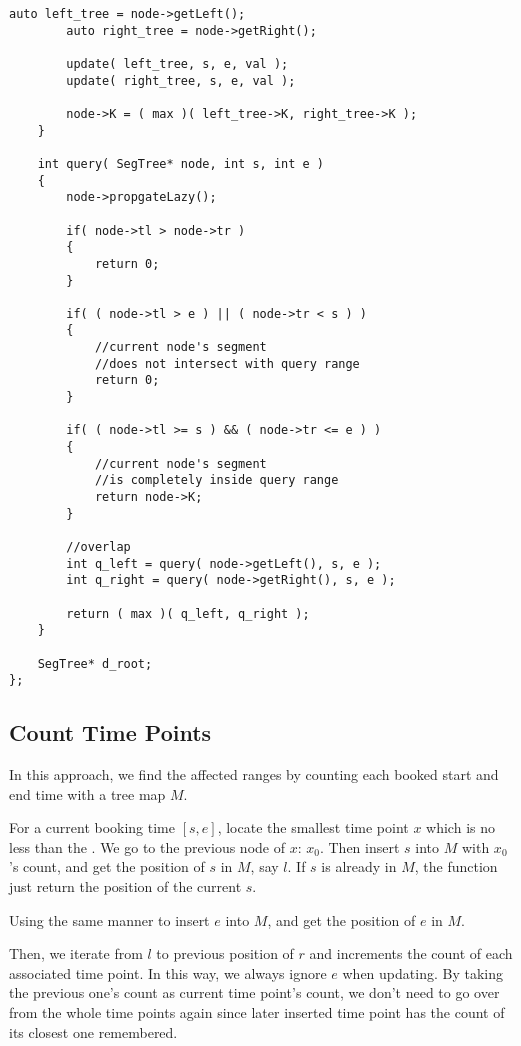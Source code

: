 \begin{lstlisting}[style=customc, caption={Segment Tree}]
        auto left_tree = node->getLeft();
        auto right_tree = node->getRight();

        update( left_tree, s, e, val );
        update( right_tree, s, e, val );

        node->K = ( max )( left_tree->K, right_tree->K );
    }

    int query( SegTree* node, int s, int e )
    {
        node->propgateLazy();

        if( node->tl > node->tr )
        {
            return 0;
        }

        if( ( node->tl > e ) || ( node->tr < s ) )
        {
            //current node's segment
            //does not intersect with query range
            return 0;
        }

        if( ( node->tl >= s ) && ( node->tr <= e ) )
        {
            //current node's segment
            //is completely inside query range
            return node->K;
        }

        //overlap
        int q_left = query( node->getLeft(), s, e );
        int q_right = query( node->getRight(), s, e );

        return ( max )( q_left, q_right );
    }

    SegTree* d_root;
};
\end{lstlisting}

\subsection{Count Time Points}
In this approach, we find the affected ranges by counting each booked start and end time with a tree map $M$.

For a current booking time $[s,e]$, locate the smallest time point $x$ which is no less than the . We go to the previous node of $x$: $x_0$. Then insert $s$ into $M$ with $x_0$'s count, and get the position of $s$ in $M$, say $l$. If $s$ is already in $M$, the function  just return the position of the current $s$. 

Using the same manner to insert $e$ into $M$, and get the position of $e$ in $M$.

Then, we iterate from $l$ to previous position of $r$ and increments the count of each associated time point. In this way, we always ignore $e$ when updating. By taking the previous one's count as current time point's count, we don't need to go over from the whole time points again since later inserted time point has the count of its closest one remembered.

